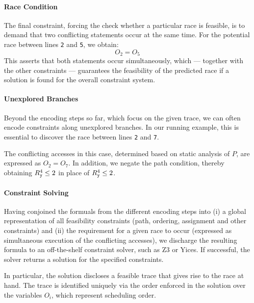 \paragraph{Race Condition} The final constraint, forcing the check whether a particular race is feasible, is to demand that two conflicting statements occur at the same time. For the potential race between lines {\tt 2} and {\tt 5}, we obtain:
$$
	O_2 = O_5
$$ 
This asserts that both statements occur simultaneously, which --- together with the other constraints --- guarantees the feasibility of the predicted race if a solution is found for the overall constraint system.

\paragraph{Unexplored Branches} Beyond the encoding steps so far, which focus on the given trace, we can often encode constraints along unexplored branches. In our running example, this is essential to discover the race between lines {\tt 2} and {\tt 7}. 

The conflicting accesses in this case, determined based on static analysis of $P$, are expressed as $O_2=O_7$. In addition, we negate the path condition, thereby obtaining $R_{\tt y}^4 \leq 2$ in place of $R_{\tt y}^4 \leq 2$. 

\paragraph{Constraint Solving} Having conjoined the formuals from the different encoding steps into (i) a global representation of all feasibility constraints (path, ordering, assignment and other constraints) and (ii) the requirement for a given race to occur (expressed as simultaneous execution of the conflicting accesses), we discharge the resulting formula to an off-the-shelf constraint solver, such as Z3 or Yices. If successful, the solver returns a solution for the specified constraints. 

In particular, the solution discloses a feasible trace that gives rise to the race at hand. The trace is identified uniquely via the order enforced in the solution over the variables $O_i$, which represent scheduling order. 